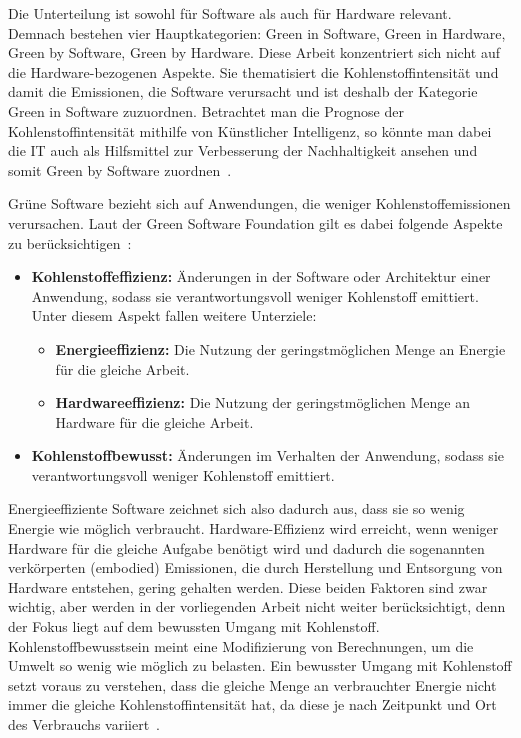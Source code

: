 Die Unterteilung ist sowohl für Software als auch für Hardware relevant.
Demnach bestehen vier Hauptkategorien:
Green in Software, Green in Hardware, Green by Software, Green by Hardware.
Diese Arbeit konzentriert sich nicht auf die Hardware-bezogenen Aspekte.
Sie thematisiert die Kohlenstoffintensität und damit die Emissionen, die Software verursacht und ist deshalb der Kategorie Green in Software zuzuordnen.
Betrachtet man die Prognose der Kohlenstoffintensität mithilfe von Künstlicher Intelligenz, so könnte man dabei die \ac{IT} auch als Hilfsmittel zur Verbesserung der Nachhaltigkeit ansehen und somit Green by Software zuordnen~\cite{Calero.2015}.

Grüne Software bezieht sich auf Anwendungen, die weniger Kohlenstoffemissionen verursachen.
Laut der Green Software Foundation gilt es dabei folgende Aspekte zu berücksichtigen~\cite{GreenSoftwareFoundation.20240316T16:54:58.000Z}:

\begin{itemize}
 \item \textbf{Kohlenstoffeffizienz:}
 Änderungen in der Software oder Architektur einer Anwendung, sodass sie verantwortungsvoll weniger Kohlenstoff emittiert. Unter diesem Aspekt fallen weitere Unterziele:
 \begin{itemize}
  \item \textbf{Energieeffizienz:}
  Die Nutzung der geringstmöglichen Menge an Energie für die gleiche Arbeit.
  \item \textbf{Hardwareeffizienz:}
  Die Nutzung der geringstmöglichen Menge an Hardware für die gleiche Arbeit.
 \end{itemize}
 \item \textbf{Kohlenstoffbewusst:}
 Änderungen im Verhalten der Anwendung, sodass sie verantwortungsvoll weniger Kohlenstoff emittiert.
\end{itemize}

Energieeffiziente Software zeichnet sich also dadurch aus, dass sie so wenig Energie wie möglich verbraucht.
Hardware-Effizienz wird erreicht, wenn weniger Hardware für die gleiche Aufgabe benötigt wird und dadurch die sogenannten verkörperten (embodied) Emissionen, die durch Herstellung und Entsorgung von Hardware entstehen, gering gehalten werden.
Diese beiden Faktoren sind zwar wichtig, aber werden in der vorliegenden Arbeit nicht weiter berücksichtigt, denn der Fokus liegt auf dem bewussten Umgang mit Kohlenstoff.
Kohlenstoffbewusstsein meint eine Modifizierung von Berechnungen, um die Umwelt so wenig wie möglich zu belasten.
Ein bewusster Umgang mit Kohlenstoff setzt voraus zu verstehen, dass die gleiche Menge an verbrauchter Energie nicht immer die gleiche Kohlenstoffintensität hat, da diese je nach Zeitpunkt und Ort des Verbrauchs variiert~\cite{GreenSoftwareFoundation.2022}.

